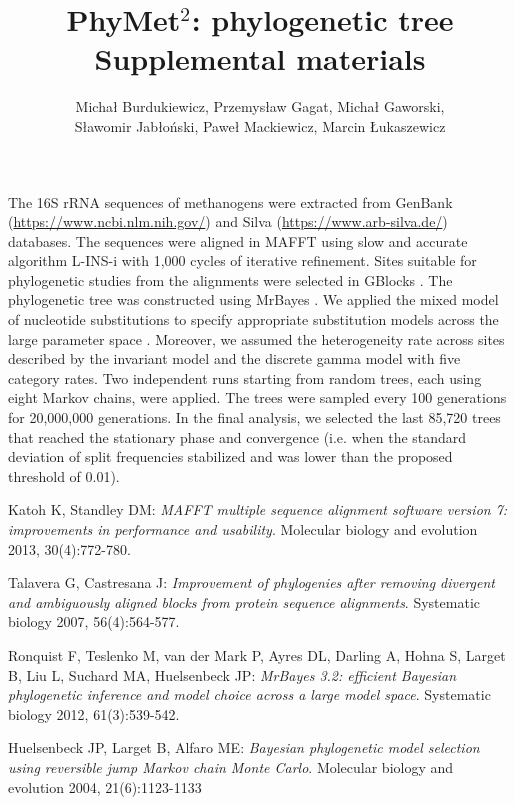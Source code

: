 \documentclass{article}
\author{Micha\l{} Burdukiewicz, Przemys\l{}aw Gagat, Micha\l{} Gaworski, \\
S\l{}awomir Jab\l{}o\'nski, Pawe\l{} Mackiewicz, Marcin \L{}ukaszewicz}
\date{}
\title{PhyMet$^2$: phylogenetic tree \\
\large Supplemental materials}
\begin{document}
\maketitle
    The 16S rRNA sequences of methanogens were extracted from GenBank 
(\url{https://www.ncbi.nlm.nih.gov/}) and Silva (\url{https://www.arb-silva.de/}) databases. 
The sequences were aligned in MAFFT using slow and accurate algorithm L-INS-i 
with 1,000 cycles of iterative refinement. Sites suitable for phylogenetic 
studies from the alignments were selected in GBlocks . The phylogenetic tree was 
constructed using MrBayes . We applied the mixed model of nucleotide 
substitutions to specify appropriate substitution models across the large 
parameter space . Moreover, we assumed the heterogeneity rate across sites 
described by the invariant model and the discrete gamma model with five category 
rates. Two independent runs starting from random trees, each using eight Markov 
chains, were applied. The trees were sampled every 100 generations for 
20,000,000 generations. In the final analysis, we selected the last 85,720 trees 
that reached the stationary phase and convergence (i.e. when the standard 
deviation of split frequencies stabilized and was lower than the proposed 
threshold of 0.01).


\begin{thebibliography}{9}
Katoh K, Standley DM:
\textit{MAFFT multiple sequence alignment software version 7: 
improvements in performance and usability}. 
Molecular biology and evolution 2013, 30(4):772-780.
 
Talavera G, Castresana J:
\textit{Improvement of phylogenies after removing 
divergent and ambiguously aligned blocks from protein sequence alignments}. 
Systematic biology 2007, 56(4):564-577.

Ronquist F, Teslenko M, van der Mark P, Ayres DL, Darling A, Hohna S, 
Larget B, Liu L, Suchard MA, Huelsenbeck JP:
\textit{MrBayes 3.2: efficient Bayesian 
phylogenetic inference and model choice across a large model space}. 
Systematic biology 2012, 61(3):539-542.

Huelsenbeck JP, Larget B, Alfaro ME:
\textit{Bayesian phylogenetic model 
selection using reversible jump Markov chain Monte Carlo}. Molecular biology and 
evolution 2004, 21(6):1123-1133

\end{thebibliography}
\end{document}
